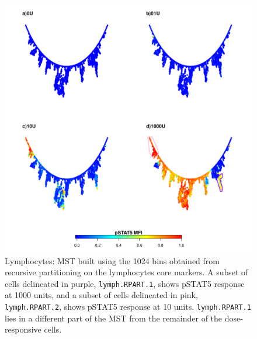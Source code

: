 \begin{figure}
\centering
\includegraphics[scale=.7]{figures/rpart-lymphocytes-mst-1024bin}
{ Lymphocytes: MST built using the 1024 bins obtained from recursive partitioning on the lymphocytes core markers.}
{
A subset of cells delineated in purple, \texttt{lymph.RPART.1}, shows pSTAT5 response at 1000 units, and a subset of cells delineated in pink, \texttt{lymph.RPART.2}, shows pSTAT5 response at 10 units.
\texttt{lymph.RPART.1} lies in a different part of the \gls{MST} from the remainder of the dose-responsive cells.
}
\end{figure}

